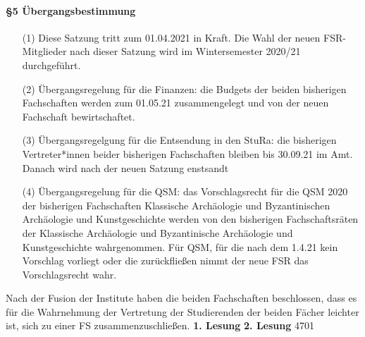 {    \paragraph{§5 Übergangsbestimmung}
    \begin{enumerate}
        \item[(1)] Diese  Satzung  tritt  zum  01.04.2021  in  Kraft.  Die  Wahl  der  neuen  FSR-Mitglieder  nach dieser Satzung wird im Wintersemester 2020/21 durchgeführt.
        \item[(2)] Übergangsregelung  für  die  Finanzen:  die  Budgets  der  beiden  bisherigen  Fachschaften werden zum 01.05.21 zusammengelegt und von der neuen Fachschaft bewirtschaftet.
        \item[(3)] Übergangsregelgung für die Entsendung in den StuRa: die bisherigen Vertreter*innen beider bisherigen Fachschaften bleiben bis 30.09.21 im Amt. Danach wird nach der neuen Satzung enstsandt
        \item[(4)] Übergangsregelung  für  die  QSM:  das  Vorschlagsrecht  für  die  QSM  2020  der  bisherigen Fachschaften Klassische Archäologie und Byzantinischen Archäologie und Kunstgeschichte werden von den bisherigen Fachschaftsräten der Klassische Archäologie und Byzantinische Archäologie und Kunstgeschichte wahrgenommen. Für QSM, für die nach dem 1.4.21 kein Vorschlag vorliegt oder die zurückfließen nimmt der neue FSR das Vorschlagsrecht wahr.  
    \end{enumerate}
}{
    Nach der Fusion der Institute haben die beiden Fachschaften beschlossen, dass es für die Wahrnehmung der Vertretung der Studierenden der beiden Fächer leichter ist, sich zu einer FS zusammenzuschließen.
}{
    \textbf{1. Lesung}
    \ul{}
    \textbf{2. Lesung}
    \ul{}
}{47}{0}{1}
